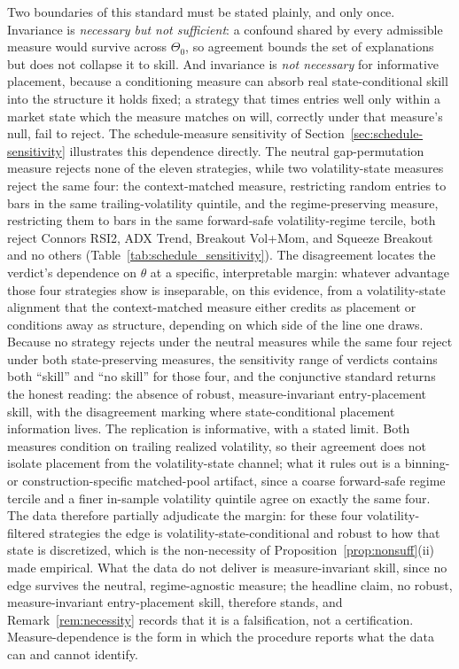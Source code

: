 \documentclass[risks,article,submit,pdftex,oneauthor]{Definitions/mdpi}
\begin{document}
Two boundaries of this standard must be stated plainly, and only once. Invariance is
\emph{necessary but not sufficient}: a confound shared by every admissible measure
would survive across $\Theta_0$, so agreement bounds the set of explanations but does
not collapse it to skill. And invariance is \emph{not necessary} for informative
placement, because a conditioning measure can absorb real state-conditional skill into
the structure it holds fixed; a strategy that times entries well only within a market
state which the measure matches on will, correctly under that measure's null, fail to
reject. The schedule-measure sensitivity of Section~\ref{sec:schedule-sensitivity}
illustrates this dependence directly. The neutral gap-permutation measure rejects none
of the eleven strategies, while two volatility-state measures reject the same four: the context-matched measure, restricting random
entries to bars in the same trailing-volatility quintile, and the regime-preserving measure, restricting them to bars in the same forward-safe volatility-regime tercile, both reject Connors RSI2,
ADX Trend, Breakout Vol+Mom, and Squeeze Breakout and no others (Table~\ref{tab:schedule_sensitivity}). The disagreement locates the
verdict's dependence on $\theta$ at a specific, interpretable margin: whatever
advantage those four strategies show is inseparable, on this evidence, from a
volatility-state alignment that the context-matched measure either credits as
placement or conditions away as structure, depending on which side of the line one
draws. Because no strategy rejects under the neutral measures while the same four reject under both state-preserving measures, the sensitivity range of
verdicts contains both ``skill'' and ``no skill'' for those four, and the conjunctive
standard returns the honest reading: the absence of robust, measure-invariant
entry-placement skill, with the disagreement marking where state-conditional
placement information lives. The replication is informative, with a stated limit. Both measures condition on trailing realized volatility, so their agreement does not isolate placement from the volatility-state channel; what it rules out is a binning- or construction-specific matched-pool artifact, since a coarse forward-safe regime tercile and a finer in-sample volatility quintile agree on exactly the same four. The data therefore partially adjudicate the margin: for these four volatility-filtered strategies the edge is volatility-state-conditional and robust to how that state is discretized, which is the non-necessity of Proposition~\ref{prop:nonsuff}(ii) made empirical. What the data do not deliver is measure-invariant skill, since no edge survives the neutral, regime-agnostic measure; the headline claim, no robust, measure-invariant entry-placement skill, therefore stands, and Remark~\ref{rem:necessity} records that it is a falsification, not a certification. Measure-dependence is the form in which the procedure reports what the
data can and cannot identify.
\end{document}
